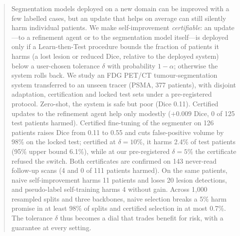 \begin{abstract}
Segmentation models deployed on a new domain can be improved with a few labelled cases, but an update that helps on average can still silently harm individual patients.
We make self-improvement \emph{certifiable}: an update---to a refinement agent or to the segmentation model itself---is deployed only if a Learn-then-Test procedure bounds the fraction of patients it harms (a lost lesion or reduced Dice, relative to the deployed system) below a user-chosen tolerance $\delta$ with probability $1-\alpha$; otherwise the system rolls back.
We study an FDG PET/CT tumour-segmentation system transferred to an unseen tracer (PSMA, 377 patients), with disjoint adaptation, certification and locked test sets under a pre-registered protocol.
Zero-shot, the system is safe but poor (Dice 0.11).
Certified updates to the refinement agent help only modestly ($+0.009$ Dice, 0 of 125 test patients harmed).
Certified fine-tuning of the segmenter on 126 patients raises Dice from 0.11 to 0.55 and cuts false-positive volume by 98\% on the locked test; certified at $\delta=10\%$, it harms 2.4\% of test patients (95\% upper bound 6.1\%), while at our pre-registered $\delta=5\%$ the certificate refused the switch.
Both certificates are confirmed on 143 never-read follow-up scans (4 and 0 of 111 patients harmed).
On the same patients, naive self-improvement harms 11 patients and loses 20 lesion detections, and pseudo-label self-training harms 4 without gain.
Across 1,000 resampled splits and three backbones, naive selection breaks a 5\% harm promise in at least 98\% of splits and certified selection in at most 0.7\%.
The tolerance $\delta$ thus becomes a dial that trades benefit for risk, with a guarantee at every setting.
\end{abstract}
